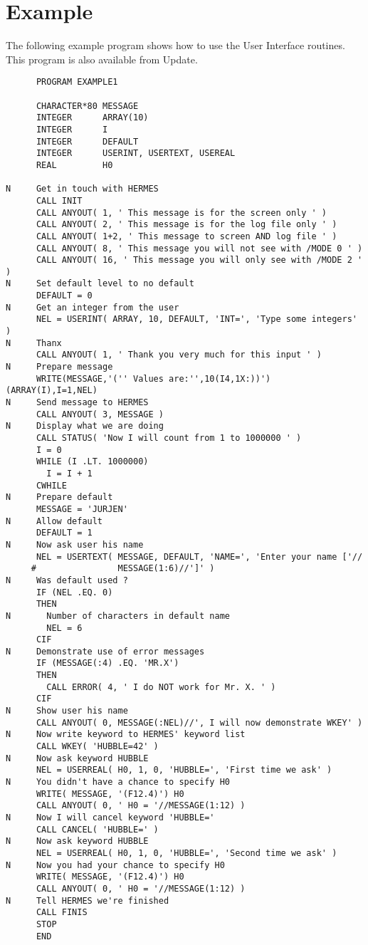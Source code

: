 \section{Example}

The following example program shows how to use the User Interface
routines.  This program is also available from Update.

\begin{verbatim}
      PROGRAM EXAMPLE1

      CHARACTER*80 MESSAGE
      INTEGER      ARRAY(10)
      INTEGER      I
      INTEGER      DEFAULT
      INTEGER      USERINT, USERTEXT, USEREAL
      REAL         H0

N     Get in touch with HERMES
      CALL INIT
      CALL ANYOUT( 1, ' This message is for the screen only ' )
      CALL ANYOUT( 2, ' This message is for the log file only ' )
      CALL ANYOUT( 1+2, ' This message to screen AND log file ' )
      CALL ANYOUT( 8, ' This message you will not see with /MODE 0 ' )
      CALL ANYOUT( 16, ' This message you will only see with /MODE 2 ' )
N     Set default level to no default
      DEFAULT = 0
N     Get an integer from the user
      NEL = USERINT( ARRAY, 10, DEFAULT, 'INT=', 'Type some integers' )
N     Thanx
      CALL ANYOUT( 1, ' Thank you very much for this input ' )
N     Prepare message
      WRITE(MESSAGE,'('' Values are:'',10(I4,1X:))') (ARRAY(I),I=1,NEL)
N     Send message to HERMES
      CALL ANYOUT( 3, MESSAGE )
N     Display what we are doing
      CALL STATUS( 'Now I will count from 1 to 1000000 ' )
      I = 0
      WHILE (I .LT. 1000000)
        I = I + 1
      CWHILE
N     Prepare default
      MESSAGE = 'JURJEN'
N     Allow default
      DEFAULT = 1
N     Now ask user his name
      NEL = USERTEXT( MESSAGE, DEFAULT, 'NAME=', 'Enter your name ['//
     #                MESSAGE(1:6)//']' )
N     Was default used ?
      IF (NEL .EQ. 0)
      THEN
N       Number of characters in default name
        NEL = 6
      CIF
N     Demonstrate use of error messages
      IF (MESSAGE(:4) .EQ. 'MR.X')
      THEN
        CALL ERROR( 4, ' I do NOT work for Mr. X. ' )
      CIF
N     Show user his name
      CALL ANYOUT( 0, MESSAGE(:NEL)//', I will now demonstrate WKEY' )
N     Now write keyword to HERMES' keyword list
      CALL WKEY( 'HUBBLE=42' )
N     Now ask keyword HUBBLE
      NEL = USERREAL( H0, 1, 0, 'HUBBLE=', 'First time we ask' )
N     You didn't have a chance to specify H0
      WRITE( MESSAGE, '(F12.4)') H0
      CALL ANYOUT( 0, ' H0 = '//MESSAGE(1:12) )
N     Now I will cancel keyword 'HUBBLE='
      CALL CANCEL( 'HUBBLE=' )
N     Now ask keyword HUBBLE
      NEL = USERREAL( H0, 1, 0, 'HUBBLE=', 'Second time we ask' )
N     Now you had your chance to specify H0
      WRITE( MESSAGE, '(F12.4)') H0
      CALL ANYOUT( 0, ' H0 = '//MESSAGE(1:12) )
N     Tell HERMES we're finished
      CALL FINIS
      STOP
      END
\end{verbatim}

